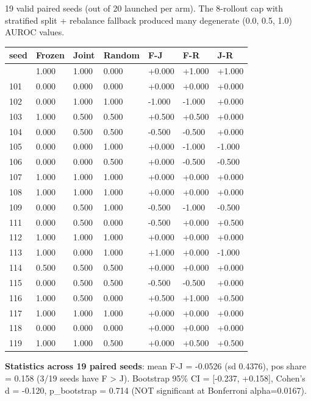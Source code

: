 \documentclass[11pt]{article}
\begin{document}
19 valid paired seeds (out of 20 launched per arm). The 8-rollout cap
with stratified split + rebalance fallback produced many degenerate
(0.0, 0.5, 1.0) AUROC values.

{\def\LTcaptype{none} %
\begin{longtable}[]{@{}lllllll@{}}
\toprule\noalign{}
seed & Frozen & Joint & Random & F-J & F-R & J-R \\
\midrule\noalign{}
\endhead
\bottomrule\noalign{}
\endlastfoot
100 & 1.000 & 1.000 & 0.000 & +0.000 & +1.000 & +1.000 \\
101 & 0.000 & 0.000 & 0.000 & +0.000 & +0.000 & +0.000 \\
102 & 0.000 & 1.000 & 1.000 & -1.000 & -1.000 & +0.000 \\
103 & 1.000 & 0.500 & 0.500 & +0.500 & +0.500 & +0.000 \\
104 & 0.000 & 0.500 & 0.500 & -0.500 & -0.500 & +0.000 \\
105 & 0.000 & 0.000 & 1.000 & +0.000 & -1.000 & -1.000 \\
106 & 0.000 & 0.000 & 0.500 & +0.000 & -0.500 & -0.500 \\
107 & 1.000 & 1.000 & 1.000 & +0.000 & +0.000 & +0.000 \\
108 & 1.000 & 1.000 & 1.000 & +0.000 & +0.000 & +0.000 \\
109 & 0.000 & 0.500 & 1.000 & -0.500 & -1.000 & -0.500 \\
111 & 0.000 & 0.500 & 0.000 & -0.500 & +0.000 & +0.500 \\
112 & 1.000 & 1.000 & 1.000 & +0.000 & +0.000 & +0.000 \\
113 & 1.000 & 0.000 & 1.000 & +1.000 & +0.000 & -1.000 \\
114 & 0.500 & 0.500 & 0.500 & +0.000 & +0.000 & +0.000 \\
115 & 0.000 & 0.500 & 0.500 & -0.500 & -0.500 & +0.000 \\
116 & 1.000 & 0.500 & 0.000 & +0.500 & +1.000 & +0.500 \\
117 & 1.000 & 1.000 & 1.000 & +0.000 & +0.000 & +0.000 \\
118 & 0.000 & 0.000 & 0.000 & +0.000 & +0.000 & +0.000 \\
119 & 1.000 & 1.000 & 0.500 & +0.000 & +0.500 & +0.500 \\
\end{longtable}
}

\textbf{Statistics across 19 paired seeds}: mean F-J = -0.0526 (sd
0.4376), pos share = 0.158 (3/19 seeds have F \textgreater{} J).
Bootstrap 95\% CI = {[}-0.237, +0.158{]}, Cohen's d = -0.120,
p\_bootstrap = 0.714 (NOT significant at Bonferroni alpha=0.0167).
\end{document}
